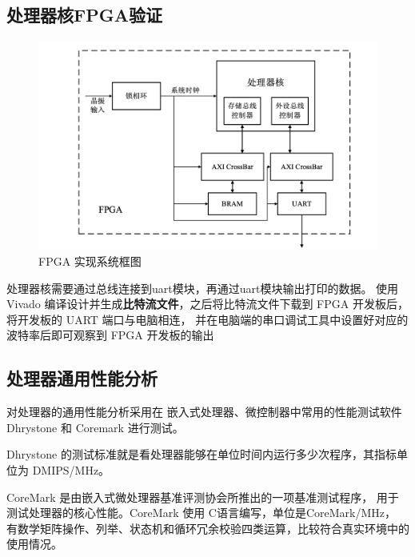 \documentclass{article}
\begin{document}
\subsection{处理器核FPGA验证}
\begin{figure}[H]
    \begin{center}
        \includegraphics[width=\textwidth]{fpga}
    \end{center}
    \caption{FPGA 实现系统框图}
    \label{fig: fpga}
\end{figure}
处理器核需要通过总线连接到uart模块，再通过uart模块输出打印的数据。
使用 Vivado 编译设计并生成\textbf{比特流文件}，之后将比特流文件下载到 FPGA 开发板后，
将开发板的 UART 端口与电脑相连，
并在电脑端的串口调试工具中设置好对应的波特率后即可观察到 FPGA 开发板的输出
\subsection{处理器通用性能分析}
对处理器的通用性能分析采用在
嵌入式处理器、微控制器中常用的性能测试软件 Dhrystone 和 Coremark 进行测试。

Dhrystone 的测试标准就是看处理器能够在单位时间内运行多少次程序，其指标单位为 DMIPS/MHz。

CoreMark 是由嵌入式微处理器基准评测协会所推出的一项基准测试程序，
用于测试处理器的核心性能。CoreMark 使用 C语言编写，单位是CoreMark/MHz，
有数学矩阵操作、列举、状态机和循环冗余校验四类运算，比较符合真实环境中的使用情况。
\end{document}
